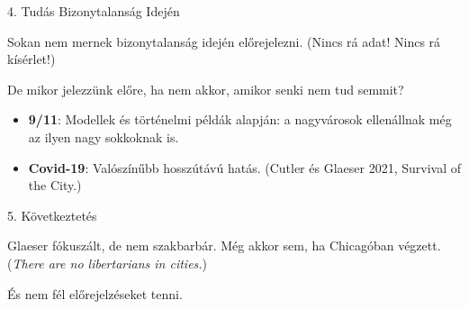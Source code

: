 \documentclass[ignorenonframetext,aspectratio=54,]{beamer}
\providecommand{\tightlist}{%
  \setlength{\itemsep}{0pt}\setlength{\parskip}{0pt}}
\begin{document}
\begin{frame}{4. Tudás Bizonytalanság Idején}
\protect\hypertarget{tuduxe1s-bizonytalansuxe1g-idejuxe9n}{}

Sokan nem mernek bizonytalanság idején előrejelezni. (Nincs rá adat!
Nincs rá kísérlet!)

De mikor jelezzünk előre, ha nem akkor, amikor senki nem tud semmit?

\begin{itemize}
\tightlist
\item
  \textbf{9/11}: Modellek és történelmi példák alapján: a nagyvárosok
  ellenállnak még az ilyen nagy sokkoknak is.
\item
  \textbf{Covid-19}: Valószínűbb hosszútávú hatás. (Cutler és Glaeser
  2021, Survival of the City.)
\end{itemize}

\end{frame}

\begin{frame}{5. Következtetés}
\protect\hypertarget{kuxf6vetkeztetuxe9s}{}

Glaeser fókuszált, de nem szakbarbár. Még akkor sem, ha Chicagóban
végzett. (\emph{There are no libertarians in cities.})

És nem fél előrejelzéseket tenni.

\end{frame}
\end{document}
